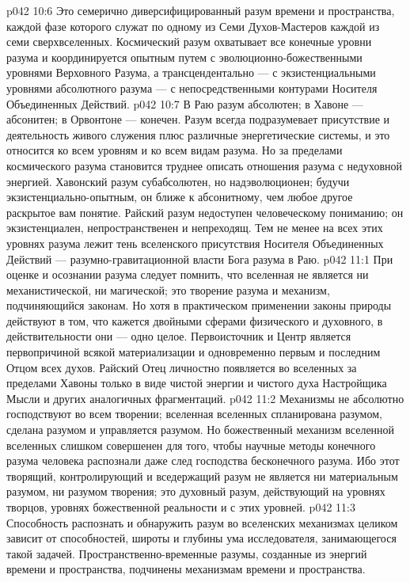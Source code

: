 \vs p042 10:6 \bibnobreakspace {} Это семерично диверсифицированный разум времени и пространства, каждой фазе которого служат по одному из Семи Духов\hyp{}Мастеров каждой из семи сверхвселенных. Космический разум охватывает все конечные уровни разума и координируется опытным путем с эволюционно\hyp{}божественными уровнями Верховного Разума, а трансцендентально --- с экзистенциальными уровнями абсолютного разума --- с непосредственными контурами Носителя Объединенных Действий.
\vs p042 10:7 В Раю разум абсолютен; в Хавоне --- абсонитен; в Орвонтоне --- конечен. Разум всегда подразумевает присутствие и деятельность живого служения плюс различные энергетические системы, и это относится ко всем уровням и ко всем видам разума. Но за пределами космического разума становится труднее описать отношения разума с недуховной энергией. Хавонский разум субабсолютен, но надэволюционен; будучи экзистенциально\hyp{}опытным, он ближе к абсонитному, чем любое другое раскрытое вам понятие. Райский разум недоступен человеческому пониманию; он экзистенциален, непространственен и непреходящ. Тем не менее на всех этих уровнях разума лежит тень вселенского присутствия Носителя Объединенных Действий --- разумно\hyp{}гравитационной власти Бога разума в Раю.
\vs p042 11:1 При оценке и осознании разума следует помнить, что вселенная не является ни механистической, ни магической; это творение разума и механизм, подчиняющийся законам. Но хотя в практическом применении законы природы действуют в том, что кажется двойными сферами физического и духовного, в действительности они --- одно целое. Первоисточник и Центр является первопричиной всякой материализации и одновременно первым и последним Отцом всех духов. Райский Отец личностно появляется во вселенных за пределами Хавоны только в виде чистой энергии и чистого духа Настройщика Мысли и других аналогичных фрагментаций.
\vs p042 11:2 \pc Механизмы не абсолютно господствуют во всем творении; вселенная вселенных  спланирована разумом, сделана разумом и управляется разумом. Но божественный механизм вселенной вселенных слишком совершенен для того, чтобы научные методы конечного разума человека распознали даже след господства бесконечного разума. Ибо этот творящий, контролирующий и вседержащий разум не является ни материальным разумом, ни разумом творения; это духовный разум, действующий на уровнях творцов, уровнях божественной реальности и с этих уровней.
\vs p042 11:3 Способность распознать и обнаружить разум во вселенских механизмах целиком зависит от способностей, широты и глубины ума исследователя, занимающегося такой задачей. Пространственно\hyp{}временные разумы, созданные из энергий времени и пространства, подчинены механизмам времени и пространства.
